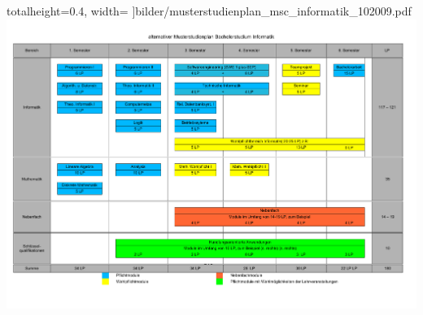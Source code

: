 \documentclass[12pt]{n-te}
\newcommand{\mehrInfo}[1]{\fbox{$\rightarrow$ #1 }}
\begin{document}
totalheight=0.4\textheight, 
width=\textwidth
]{bilder/musterstudienplan_msc_informatik_102009.pdf}
\\
\includegraphics[angle=90,
totalheight=\textheight
, width=\textwidth]{texte/bachelor/studienplan_neu}
\newpage
\begin{multicols}{2}

  \end{multicols}
\end{document}
